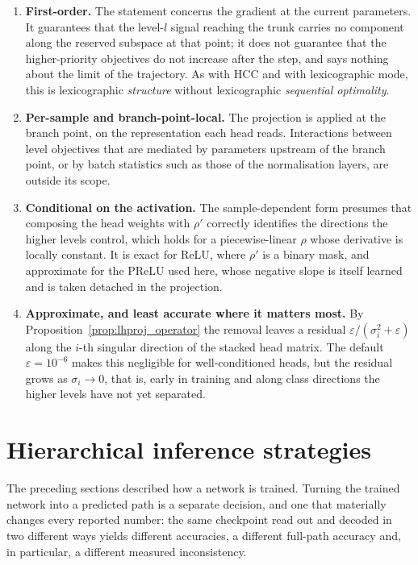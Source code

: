 \begin{enumerate}
    \item \textbf{First-order.} The statement concerns the gradient at the current
    parameters. It guarantees that the level-$l$ signal reaching the trunk carries
    no component along the reserved subspace at that point; it does not guarantee
    that the higher-priority objectives do not increase after the step, and says
    nothing about the limit of the trajectory. As with HCC and with lexicographic
    mode, this is lexicographic \emph{structure} without lexicographic
    \emph{sequential optimality}.
    \item \textbf{Per-sample and branch-point-local.} The projection is applied at
    the branch point, on the representation each head reads. Interactions between
    level objectives that are mediated by parameters upstream of the branch point,
    or by batch statistics such as those of the normalisation layers, are outside
    its scope.
    \item \textbf{Conditional on the activation.} The sample-dependent form
    presumes that composing the head weights with $\rho'$ correctly identifies the
    directions the higher levels control, which holds for a piecewise-linear
    $\rho$ whose derivative is locally constant. It is exact for ReLU, where
    $\rho'$ is a binary mask, and approximate for the PReLU used here, whose
    negative slope is itself learned and is taken detached in the projection.
    \item \textbf{Approximate, and least accurate where it matters most.} By
    Proposition~\ref{prop:lhproj_operator} the removal leaves a residual
    $\varepsilon/(\sigma_i^2+\varepsilon)$ along the $i$-th singular direction of
    the stacked head matrix. The default $\varepsilon=10^{-6}$ makes this
    negligible for well-conditioned heads, but the residual grows as $\sigma_i\to
    0$, that is, early in training and along class directions the higher levels
    have not yet separated.
\end{enumerate}


\section{Hierarchical inference strategies}
\label{sec:methodology_inference}

The preceding sections described how a network is trained. Turning the trained
network into a predicted path is a separate decision, and one that materially
changes every reported number: the same checkpoint read out and decoded in two
different ways yields different accuracies, a different full-path accuracy and,
in particular, a different measured inconsistency.

